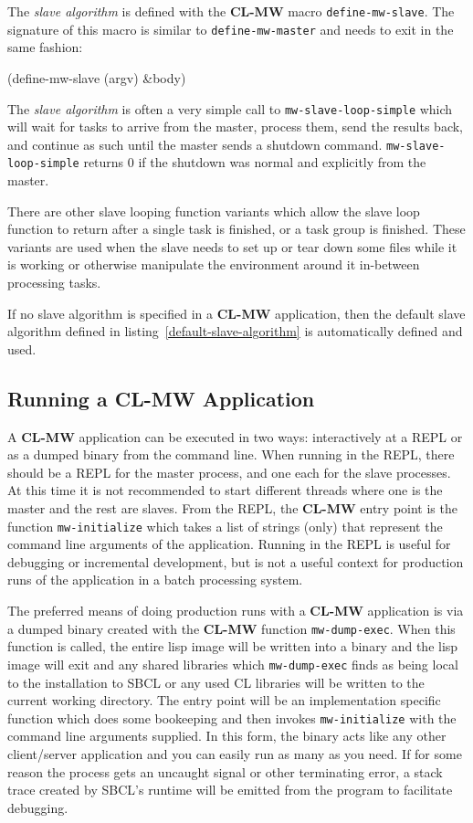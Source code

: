 \documentclass[titlepage,12pt]{book}
\newcommand{\xsmall}{\latexhtml{\small}{}}
\newcommand{\xnormalsize}{\latexhtml{\normalsize}{}}
\newcommand{\clmw}{\xsmall\textbf{CL-MW}\xnormalsize\xspace}
\newcommand{\sa}{\textit{slave algorithm}\xspace}
\newcommand{\func}[1]{\xsmall\mbox{\uppercase{\texttt{#1}}}\xnormalsize\xspace}
\newcommand{\macro}[1]{\xsmall\mbox{\uppercase{\texttt{#1}}}\xnormalsize\xspace}
\begin{document}
The \sa is defined with the \clmw macro \macro{define-mw-slave}. The
signature of this macro is similar to \macro{define-mw-master} and needs
to exit in the same fashion:

\begin{barelisp}
(define-mw-slave (argv) &body)
\end{barelisp}

The \sa is often a very simple call to \func{mw-slave-loop-simple}
which will wait for tasks to arrive from the master, process them,
send the results back, and continue as such until the master sends
a shutdown command. \func{mw-slave-loop-simple} returns 0 if the
shutdown was normal and explicitly from the master.

There are other slave looping function variants which allow the
slave loop function to return after a single task is finished, or a
task group is finished. These variants are used when the slave needs
to set up or tear down some files while it is working or otherwise
manipulate the environment around it in-between processing tasks.

If no slave algorithm is specified in a \clmw
application, then the default slave algorithm defined in
listing~\ref{default-slave-algorithm} is automatically defined
and used.

\subsection{Running a \clmw Application}

A \clmw application can be executed in two ways: interactively at
a REPL or as a dumped binary from the command line. When running in
the REPL, there should be a REPL for the master process, and one
each for the slave processes. At this time it is not recommended
to start different threads where one is the master and the rest
are slaves.  From the REPL, the \clmw entry point is the function
\func{mw-initialize} which takes a list of strings (only) that
represent the command line arguments of the application. Running
in the REPL is useful for debugging or incremental development, but
is not a useful context for production runs of the application in a
batch processing system.

The preferred means of doing production runs with a \clmw
application is via a dumped binary created with the \clmw function
\func{mw-dump-exec}. When this function is called, the entire lisp
image will be written into a binary and the lisp image will exit
and any shared libraries which \func{mw-dump-exec} finds as being
local to the installation to SBCL or any used CL libraries will be
written to the current working directory. The entry point will be an
implementation specific function which does some bookeeping and then
invokes \func{mw-initialize} with the command line arguments supplied.
In this form, the binary acts like any other client/server application
and you can easily run as many as you need.  If for some reason the
process gets an uncaught signal or other terminating error, a stack
trace created by SBCL's runtime will be emitted from the program to
facilitate debugging.
\end{document}
